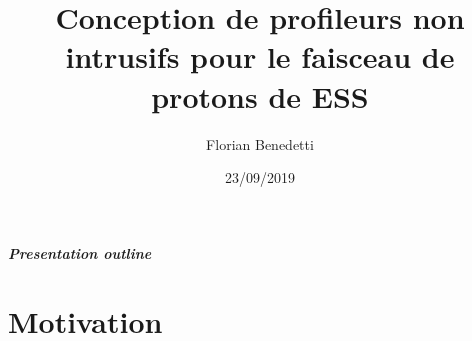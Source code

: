 \documentclass[handout]{beamer}
\title{Conception de profileurs non intrusifs pour le faisceau de protons de ESS}
\author{Florian Benedetti}
\institute{CEA/IRFU}
\date{23/09/2019}
\begin{document}
\frame{\titlepage}

\begin{frame}
  \frametitle{Presentation outline}
  \tableofcontents[hideallsubsections]
\end{frame}

\part{Motivation}

%
%

\end{document}
